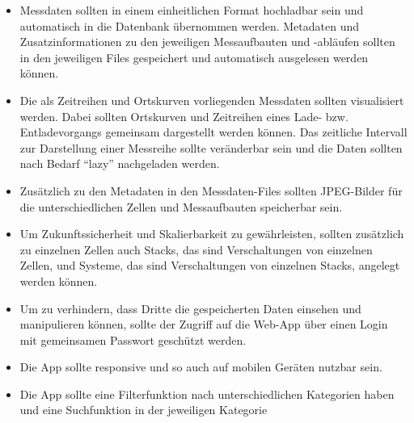 \begin{itemize}

\item Messdaten sollten in einem einheitlichen Format hochladbar sein und automatisch in die Datenbank übernommen werden. Metadaten und Zusatzinformationen zu den jeweiligen Messaufbauten und -abläufen sollten in den jeweiligen Files gespeichert und automatisch ausgelesen werden können.

\item Die als Zeitreihen und Ortskurven vorliegenden Messdaten sollten visualisiert werden. Dabei sollten Ortskurven und Zeitreihen eines Lade- bzw. Entladevorgangs gemeinsam dargestellt werden können. Das zeitliche Intervall zur Darstellung einer Messreihe sollte veränderbar sein und die Daten sollten nach Bedarf ``lazy'' nachgeladen werden.

\item Zusätzlich zu den Metadaten in den Messdaten-Files sollten JPEG-Bilder für die unterschiedlichen Zellen und Messaufbauten speicherbar sein.

\item Um Zukunftssicherheit und Skalierbarkeit zu gewährleisten, sollten zusätzlich zu einzelnen Zellen auch Stacks, das sind Verschaltungen von einzelnen Zellen, und Systeme, das sind Verschaltungen von einzelnen Stacks, angelegt werden können.

\item Um zu verhindern, dass Dritte die gespeicherten Daten einsehen und manipulieren können, sollte der Zugriff auf die Web-App über einen Login mit gemeinsamen Passwort geschützt werden.

\item Die App sollte responsive und so auch auf mobilen Geräten nutzbar sein.

\item Die App sollte eine Filterfunktion nach unterschiedlichen Kategorien haben und eine Suchfunktion in der jeweiligen Kategorie

\end{itemize}

